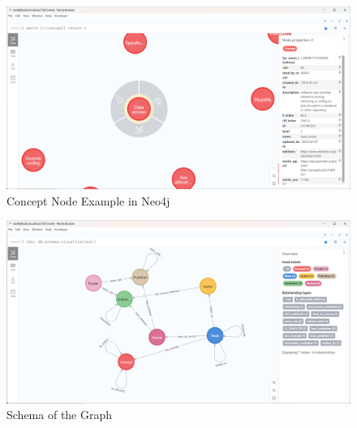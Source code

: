\documentclass[../report.tex]{subfiles}
\begin{document}
\begin{figure}[htbp]
    \centering
    \includegraphics[width=1\textwidth]{./figs/concept_node.png}
    \caption{Concept Node Example in Neo4j}
    \label{concept_node}
  \end{figure}

  \begin{figure}[htbp]
    \centering
    \includegraphics[width=1\textwidth]{./figs/schema.png}
    \caption{Schema of the Graph}
    \label{schema}
  \end{figure}
\newpage
\end{document}
